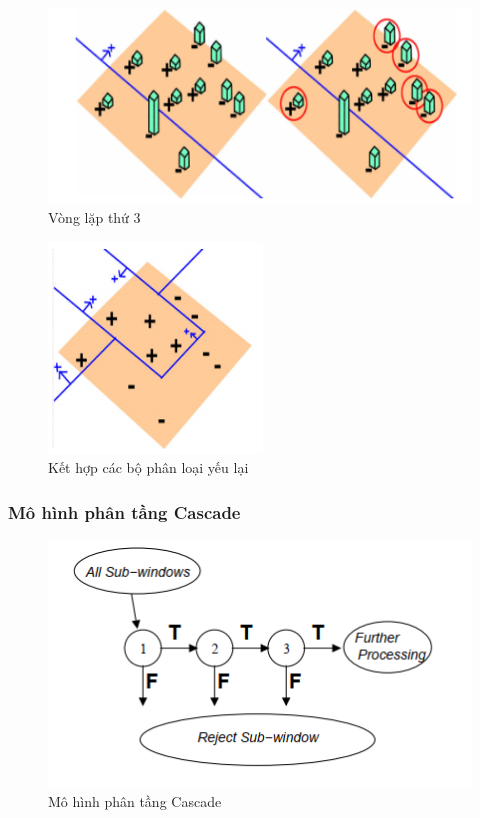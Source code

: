 \documentclass[12pt,a4paper]{article}
\begin{document}
\begin{center}
    \begin{figure}[htp]
    \begin{center}
    \includegraphics[scale=0.8]{Images/4}
    \end{center}
    \caption{Vòng lặp thứ 3}
    \end{figure}
\end{center}
\begin{center}
    \begin{figure}[htp]
    \begin{center}
    \includegraphics[scale=0.8]{Images/5}
    \end{center}
    \caption{Kết hợp các bộ phân loại yếu lại}
    \end{figure}
\end{center}
\pagebreak
\subsubsection{Mô hình phân tầng Cascade}
\begin{center}
    \begin{figure}[htp]
    \begin{center}
    \includegraphics[scale=0.8]{Images/Cas}
    \end{center}
    \caption{Mô hình phân tầng Cascade}
    \end{figure}
\end{center}
\end{document}
